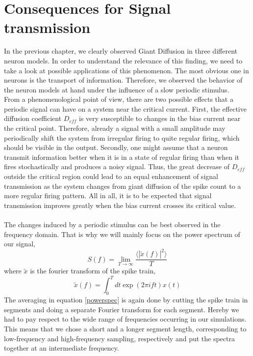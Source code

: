 \documentclass[12pt,a4paper]{article}
\begin{document}
\section{Consequences for Signal transmission}
In the previous chapter, we clearly observed Giant Diffusion in three different neuron models. In order to understand the relevance of this finding, we need to take a look at possible applications of this phenomenon. The most obvious one in neurons is the transport of information. Therefore, we observed the behavior of the neuron models at hand under the influence of a slow periodic stimulus.
\\
From a phenomenological point of view, there are two possible effects that a periodic signal can have on a system near the critical current. First, the effective diffusion coefficient $D_{eff}$ is very susceptible to changes in the bias current near the critical point. Therefore, already a signal with a small amplitude may periodically shift the system from irregular firing to quite regular firing, which should be visible in the output.
Secondly, one might assume that a neuron transmit information better when it is in a state of regular firing than when it fires stochastically and produces a noisy signal. Thus, the great decrease of $D_{eff}$ outside the critical region could lead to an equal enhancement of signal transmission as the system changes from giant diffusion of the spike count to a more regular firing pattern.
All in all, it is to be expected that signal transmission improves greatly when the bias current crosses its critical value.\\\\
The changes induced by a periodic stimulus can be best observed in the frequency domain. That is why we will mainly focus on the power spectrum of our signal,
\begin{equation}\label{powerspec}
S(f)=\lim_{T\rightarrow\infty}\frac{\langle|\tilde{x}(f)|^2\rangle}{T}
\end{equation}
where $\tilde{x}$ is the fourier transform of the spike train,
\begin{equation}
\tilde{x}(f)=\int_{0}^{T}dt \exp(2\pi ift)x(t)
\end{equation}
The averaging in equation \ref{powerspec} is again done by cutting the spike train in segments and doing a separate Fourier transform for each segment. Hereby we had to pay respect to the wide range of frequencies occurring in our simulations. This means that we chose a short and a longer segment length, corresponding to low-frequency and high-frequency sampling, respectively and put the spectra together at an intermediate frequency.
\end{document}
